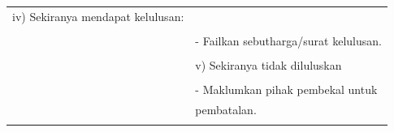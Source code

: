 \documentclass[
]{article}
\begin{document}
\begin{longtable}[]{@{}ll@{}}
\begin{minipage}[t]{0.71\columnwidth}
iv) Sekiranya mendapat kelulusan:\strut
\end{minipage}\tabularnewline
\begin{minipage}[t]{0.23\columnwidth}\raggedright
\strut
\end{minipage} & \begin{minipage}[t]{0.71\columnwidth}\raggedright
\strut
\end{minipage}\tabularnewline
\begin{minipage}[t]{0.23\columnwidth}\raggedright
\strut
\end{minipage} & \begin{minipage}[t]{0.71\columnwidth}\raggedright
- Failkan sebutharga/surat kelulusan.\strut
\end{minipage}\tabularnewline
\begin{minipage}[t]{0.23\columnwidth}\raggedright
\strut
\end{minipage} & \begin{minipage}[t]{0.71\columnwidth}\raggedright
\strut
\end{minipage}\tabularnewline
\begin{minipage}[t]{0.23\columnwidth}\raggedright
\strut
\end{minipage} & \begin{minipage}[t]{0.71\columnwidth}\raggedright
v) Sekiranya tidak diluluskan\strut
\end{minipage}\tabularnewline
\begin{minipage}[t]{0.23\columnwidth}\raggedright
\strut
\end{minipage} & \begin{minipage}[t]{0.71\columnwidth}\raggedright
\strut
\end{minipage}\tabularnewline
\begin{minipage}[t]{0.23\columnwidth}\raggedright
\strut
\end{minipage} & \begin{minipage}[t]{0.71\columnwidth}\raggedright
- Maklumkan pihak pembekal untuk\strut
\end{minipage}\tabularnewline
\begin{minipage}[t]{0.23\columnwidth}\raggedright
\strut
\end{minipage} & \begin{minipage}[t]{0.71\columnwidth}\raggedright
pembatalan.\strut
\end{minipage}\tabularnewline
\begin{minipage}[t]{0.23\columnwidth}\raggedright
\strut
\end{minipage} & \begin{minipage}[t]{0.71\columnwidth}\raggedright

\end{minipage}
\end{longtable}
\end{document}
